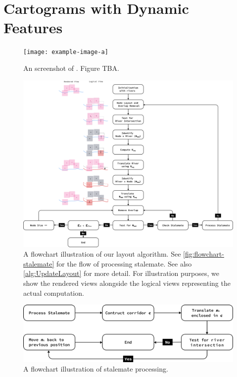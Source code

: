 \section{Cartograms with Dynamic Features}

 {
  \begin{figure}[tb!]
      \centering
      \texttt{[image: example-image-a]}
      \caption{An screenshot of \software. Figure TBA.}
      \label{fig:overview}
  \end{figure}
 }

 {
  \begin{figure}[tb!]
      \centering
      \includegraphics[width=\textwidth,height=0.95\textheight,keepaspectratio]{figure/flowchart.png}
      \caption{A flowchart illustration of our layout algorithm. See \autoref{fig:flowchart-stalemate} for the flow of processing stalemate. See also \autoref{alg:UpdateLayout} for more detail. For illustration purposes, we show the rendered views alongside the logical views representing the actual computation.}
      \label{fig:flowchart}
  \end{figure}

  \begin{figure}[tb!]
      \centering
      \includegraphics[width=0.9\columnwidth,keepaspectratio]{figure/flowchart stalemate.png}
      \caption{A flowchart illustration of stalemate processing.}
      \label{fig:flowchart-stalemate}
  \end{figure}
 }

